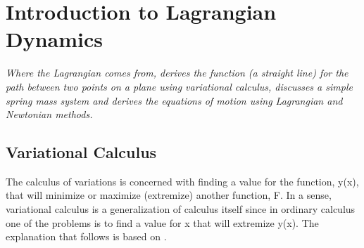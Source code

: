 \chapter{Introduction to Lagrangian Dynamics}
\textit{Where the Lagrangian comes from, derives the function (a straight line)
for the path between two points on a plane using variational calculus, discusses
a simple spring mass system and derives the equations of motion using Lagrangian
and Newtonian methods.}
\section{Variational Calculus}
The calculus of variations is concerned with finding a value for the function,
y(x), that will minimize or maximize (extremize) another function, F. In a
sense, variational calculus is a generalization of calculus itself since in
ordinary calculus one of the problems is to find a value for x that will
extremize y(x). The explanation that follows is based on \cite{DurrantFraser}.
